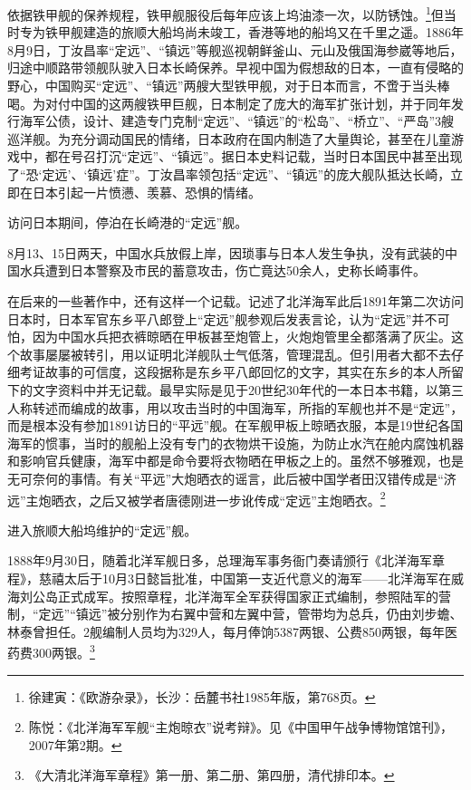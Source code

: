 \documentclass[12pt,UTF8]{ctexbook}
\begin{document}
依据铁甲舰的保养规程，铁甲舰服役后每年应该上坞油漆一次，以防锈蚀。\footnote{徐建寅：《欧游杂录》，长沙：岳麓书社1985年版，第768页。}但当时专为铁甲舰建造的旅顺大船坞尚未竣工，香港等地的船坞又在千里之遥。1886年8月9日，丁汝昌率“定远”、“镇远”等舰巡视朝鲜釜山、元山及俄国海参崴等地后，归途中顺路带领舰队驶入日本长崎保养。早视中国为假想敌的日本，一直有侵略的野心，中国购买“定远”、“镇远”两艘大型铁甲舰，对于日本而言，不啻于当头棒喝。为对付中国的这两艘铁甲巨舰，日本制定了庞大的海军扩张计划，并于同年发行海军公债，设计、建造专门克制“定远”、“镇远”的“松岛”、“桥立”、“严岛”3艘巡洋舰。为充分调动国民的情绪，日本政府在国内制造了大量舆论，甚至在儿童游戏中，都在号召打沉“定远”、“镇远”。据日本史料记载，当时日本国民中甚至出现了“恐‘定远’、‘镇远’症”。丁汝昌率领包括“定远”、“镇远”的庞大舰队抵达长崎，立即在日本引起一片愤懑、羡慕、恐惧的情绪。

访问日本期间，停泊在长崎港的“定远”舰。

8月13、15日两天，中国水兵放假上岸，因琐事与日本人发生争执，没有武装的中国水兵遭到日本警察及市民的蓄意攻击，伤亡竟达50余人，史称长崎事件。

在后来的一些著作中，还有这样一个记载。记述了北洋海军此后1891年第二次访问日本时，日本军官东乡平八郎登上“定远”舰参观后发表言论，认为“定远”并不可怕，因为中国水兵把衣裤晾晒在甲板甚至炮管上，火炮炮管里全都落满了灰尘。这个故事屡屡被转引，用以证明北洋舰队士气低落，管理混乱。但引用者大都不去仔细考证故事的可信度，这段据称是东乡平八郎回忆的文字，其实在东乡的本人所留下的文字资料中并无记载。最早实际是见于20世纪30年代的一本日本书籍，以第三人称转述而编成的故事，用以攻击当时的中国海军，所指的军舰也并不是“定远”，而是根本没有参加1891访日的“平远”舰。在军舰甲板上晾晒衣服，本是19世纪各国海军的惯事，当时的舰船上没有专门的衣物烘干设施，为防止水汽在舱内腐蚀机器和影响官兵健康，海军中都是命令要将衣物晒在甲板之上的。虽然不够雅观，也是无可奈何的事情。有关“平远”大炮晒衣的谣言，此后被中国学者田汉错传成是“济远”主炮晒衣，之后又被学者唐德刚进一步讹传成“定远”主炮晒衣。\footnote{陈悦：《北洋海军军舰“主炮晾衣”说考辩》。见《中国甲午战争博物馆馆刊》，2007年第2期。}

进入旅顺大船坞维护的“定远”舰。

1888年9月30日，随着北洋军舰日多，总理海军事务衙门奏请颁行《北洋海军章程》，慈禧太后于10月3日懿旨批准，中国第一支近代意义的海军——北洋海军在威海刘公岛正式成军。按照章程，北洋海军全军获得国家正式编制，参照陆军的营制，“定远”“镇远”被分别作为右翼中营和左翼中营，管带均为总兵，仍由刘步蟾、林泰曾担任。2舰编制人员均为329人，每月俸饷5387两银、公费850两银，每年医药费300两银。\footnote{《大清北洋海军章程》第一册、第二册、第四册，清代排印本。}
\end{document}

